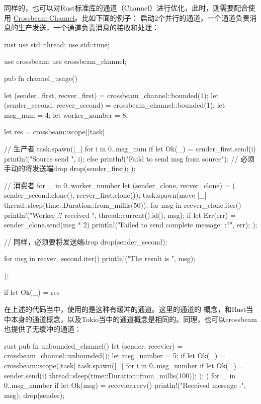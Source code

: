 同样的，也可以对Rust标准库的通道（Channel）进行优化，此时，则需要配合使用
\href{https://github.com/crossbeam-rs/crossbeam}{Crossbeam-Channel}。比如下面的例子：
启动2个并行的通道，一个通道负责消息的生产发送，一个通道负责消息的接收和处理：
\begin{code-block}{rust}
use std::thread;
use std::time;

use crossbeam;
use crossbeam_channel;

pub fn channel_usage() {
    let (sender_first, recver_first) = crossbeam_channel::bounded(1);
    let (sender_second, recver_second) = crossbeam_channel::bounded(1);
    let msg_num = 4;
    let worker_number = 8;

    let res = crossbeam::scope(|task| {
        // 生产者
        task.spawn(|_| {
            for i in 0..msg_num {
                if let Ok(_) = sender_first.send(i) {
                    println!("Source send {}", i);
                } else {
                    println!("Faild to send msg from source");
                }
            }
            // 必须手动的将发送端drop
            drop(sender_first);
        });

        // 消费者
        for _ in 0..worker_number {
            let (sender_clone, recver_clone) = (
                sender_second.clone(), recver_first.clone());
            task.spawn(move |_| {
                thread::sleep(time::Duration::from_millis(50));
                for msg in recver_clone.iter() {
                    println!("Worker {:?} received {}",
                        thread::current().id(), msg);
                    if let Err(err) = sender_clone.send(msg * 2) {
                        println!("Failed to send complete message: {:?}", err);
                    }
                }
            });
        }

        // 同样，必须要将发送端drop
        drop(sender_second);

        for msg in recver_second.iter() {
            println!("The result is {}", msg);
        }
    });

    if let Ok(_) = res {}
}
\end{code-block}

在上述的代码当中，使用的是这种有缓冲的通道。这里的通道的
概念，和Rust当中本身的通道概念，以及Tokio当中的通道概念是相同的。同理，也可以crossbeam
也提供了无缓冲的通道：
\begin{code-block}{rust}
pub fn unbounded_channel() {
    let (sender, recevier) = crossbeam_channel::unbounded();
    let msg_number = 5;
    if let Ok(_) = crossbeam::scope(|task| {
        task.spawn(|_| {
            for i in 0..msg_number {
                if let Ok(_) = sender.send(i) {
                    thread::sleep(time::Duration::from_millis(100));
                }
            }
        });
    }) {
        for _ in 0..msg_number {
            if let Ok(msg) = recevier.recv() {
                println!("Received message :{}", msg);
            }
        }
    }
    drop(sender);
}
\end{code-block}

